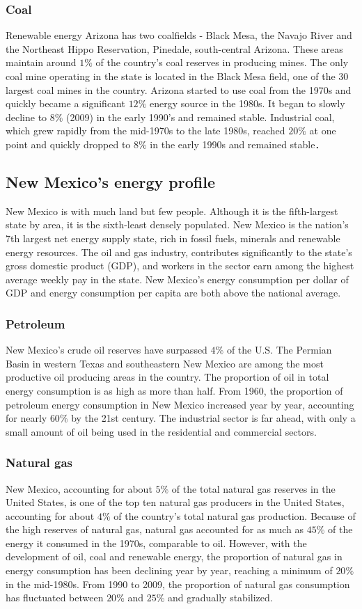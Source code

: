 \documentclass{mcmthesis}
\begin{document}
\subsubsection{Coal}
  Renewable energy Arizona has two coalfields - Black Mesa, the Navajo River and the Northeast Hippo Reservation, Pinedale, south-central Arizona.
  These areas maintain around $1\%$ of the country's coal reserves in producing mines. The only coal mine operating in the state is located in the Black
  Mesa field, one of the 30 largest coal mines in the country. Arizona started to use coal from the 1970s and quickly became a significant $12\%$ energy
  source in the 1980s. It began to slowly decline to $8\%$ (2009) in the early 1990's and remained stable. Industrial coal,
  which grew rapidly from the mid-1970s to the late 1980s, reached $20\%$ at one point and quickly dropped to $8\%$ in the early 1990s and remained stable．
\subsection{New Mexico's energy profile}
New Mexico is with much land but few people. Although it is the fifth-largest state by area, it is the sixth-least densely populated.
New Mexico is the nation's 7th largest net energy supply state, rich in fossil fuels, minerals and renewable energy resources.
The oil and gas industry, contributes significantly to the state's gross domestic product (GDP),
and workers in the sector earn among the highest average weekly pay in the state.
New Mexico's energy consumption per dollar of GDP and energy consumption per capita are both above the national average.
\subsubsection{Petroleum}
  New Mexico's crude oil reserves have surpassed $4\%$ of the U.S. The Permian Basin in western Texas and southeastern New Mexico are among
  the most productive oil producing areas in the country. The proportion of oil in total energy consumption is as high as more than half.
  From 1960, the proportion of petroleum energy consumption in New Mexico increased year by year, accounting for nearly $60\%$ by the 21st century.
  The industrial sector is far ahead, with only a small amount of oil being used in the residential and commercial sectors.
\subsubsection{Natural gas}
  New Mexico, accounting for about $5\%$ of the total natural gas reserves in the United States, is one of the top ten natural gas
  producers in the United States, accounting for about $4\%$ of the country's total natural gas production. Because of the high reserves of
  natural gas, natural gas accounted for as much as $45\%$ of the energy it consumed in the 1970s, comparable to oil.
  However, with the development of oil, coal and renewable energy, the proportion of natural gas in energy consumption has been declining year by year,
  reaching a minimum of $20\%$ in the mid-1980s. From 1990 to 2009, the proportion of natural gas consumption has fluctuated between $20\%$ and $25\%$
   and gradually stabilized.
\end{document}
